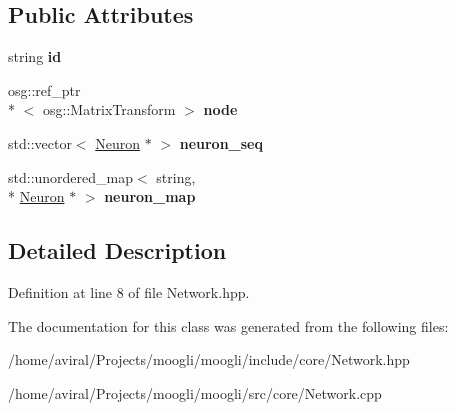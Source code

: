 \subsection*{Public Attributes}
\begin{DoxyCompactItemize}
\item 
\hypertarget{classNetwork_ab6b806d899bb652ab3adef5b875808ac}{string {\bfseries id}}\label{classNetwork_ab6b806d899bb652ab3adef5b875808ac}

\item 
\hypertarget{classNetwork_a61acd17e5cdd3b17a5a03fd477589ba0}{osg\-::ref\-\_\-ptr\\*
$<$ osg\-::\-Matrix\-Transform $>$ {\bfseries node}}\label{classNetwork_a61acd17e5cdd3b17a5a03fd477589ba0}

\item 
\hypertarget{classNetwork_a827505139b624d85bcfec8daec09bc67}{std\-::vector$<$ \hyperlink{classNeuron}{Neuron} $\ast$ $>$ {\bfseries neuron\-\_\-seq}}\label{classNetwork_a827505139b624d85bcfec8daec09bc67}

\item 
\hypertarget{classNetwork_a2246991999dae19f9b012cff6fb9373a}{std\-::unordered\-\_\-map$<$ string, \\*
\hyperlink{classNeuron}{Neuron} $\ast$ $>$ {\bfseries neuron\-\_\-map}}\label{classNetwork_a2246991999dae19f9b012cff6fb9373a}

\end{DoxyCompactItemize}


\subsection{Detailed Description}


Definition at line 8 of file Network.\-hpp.



The documentation for this class was generated from the following files\-:\begin{DoxyCompactItemize}
\item 
/home/aviral/\-Projects/moogli/moogli/include/core/Network.\-hpp\item 
/home/aviral/\-Projects/moogli/moogli/src/core/Network.\-cpp\end{DoxyCompactItemize}
